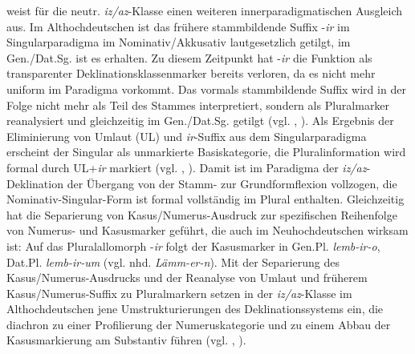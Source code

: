  weist für die neutr. \textit{iz/az}{}-Klasse einen weiteren innerparadigmatischen Ausgleich aus. Im Althochdeutschen ist das frühere stammbildende Suffix \mbox{-\textit{ir}} im Singularparadigma im Nominativ/Akkusativ lautgesetzlich getilgt, im Gen./Dat.Sg. ist es erhalten. Zu diesem Zeitpunkt hat -\textit{ir} die Funktion als transparenter Deklinationsklassenmarker bereits verloren, da es nicht mehr uniform im Paradigma vorkommt. Das vormals stammbildende Suffix wird in der Folge nicht mehr als Teil des Stammes interpretiert, sondern als Pluralmarker reanalysiert und gleichzeitig im Gen./Dat.Sg. getilgt (vgl. \citealt[50]{Nübling2005}, \citealt[87--89]{Wegener2005}). Als Ergebnis der Eliminierung von Umlaut (UL) und \textit{ir}{}-Suffix aus dem Singularparadigma erscheint der Singular als unmarkierte Basiskategorie, die Pluralinformation wird formal durch UL+\textit{ir} markiert (vgl. \citealt[51]{Nübling2005}, \citealt[1691]{Solms2004}). Damit ist im Paradigma der \textit{iz/az}{}-Deklination der Übergang von der Stamm- zur Grundformflexion vollzogen, die Nominativ-Singular-Form ist formal vollständig im Plural enthalten. Gleichzeitig hat die Separierung von Kasus/Numerus-Ausdruck zur spezifischen Reihenfolge von Numerus- und Kasusmarker geführt, die auch im Neuhochdeutschen wirksam ist: Auf das Pluralallomorph \mbox{-\textit{ir}} folgt der Kasusmarker in Gen.Pl. \textit{lemb-ir-o}, Dat.Pl. \textit{lemb-ir-um} (vgl. nhd. \textit{Lämm-er-n}). Mit der Separierung des Kasus/Numerus-Ausdrucks und der Reanalyse von Umlaut und früherem Kasus/Numerus-Suffix zu Pluralmarkern setzen in der \textit{iz/az}{}-Klasse im Althochdeutschen jene Umstrukturierungen des Deklinationssystems ein, die diachron zu einer Profilierung der Numeruskategorie und zu einem Abbau der Kasusmarkierung am Substantiv führen (vgl. \citealt[195--199]{DammelGillmann2014}, \citealt[85]{Kürschner2008a}).\pagebreak

